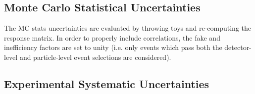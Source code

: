 \subsection{Monte Carlo Statistical Uncertainties}
\label{sec:gbb-systs:MCstat}

The MC stats uncertainties are evaluated by throwing toys and re-computing the response matrix. In order to properly include correlations, the fake and inefficiency factors are set to unity (i.e. only events which pass both the detector-level and particle-level event selections are considered).

\subsection{Experimental Systematic Uncertainties}
\label{sec:gbb-systs:exp}

